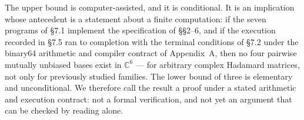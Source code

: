 %
%

The upper bound is computer-assisted, and it is conditional. It is an
implication whose antecedent is a statement about a finite computation: if the
seven programs of \S7.1 implement the specification of \S\S2--6, and if the
execution recorded in \S7.5 ran to completion with the terminal conditions of
\S7.2 under the binary64 arithmetic and compiler contract of Appendix~A, then
no four pairwise mutually unbiased bases exist in $\mathbb{C}^6$ --- for
arbitrary complex Hadamard matrices, not only for previously studied families.
The lower bound of three is elementary and unconditional. We therefore call the
result a proof under a stated arithmetic and execution contract: not a formal
verification, and not yet an argument that can be checked by reading alone.


